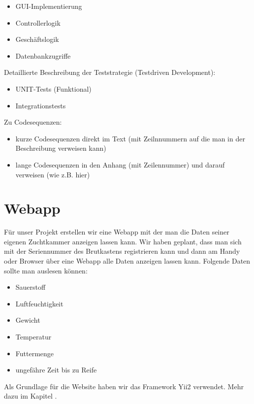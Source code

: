 \begin{itemize}
	\item GUI-Implementierung
	\item Controllerlogik
	\item Geschäftslogik
	\item Datenbankzugriffe
\end{itemize}

Detaillierte Beschreibung der Teststrategie (Testdriven Development):

\begin{itemize}
	\item UNIT-Tests (Funktional)
	\item Integrationstests
\end{itemize}

Zu Codesequenzen:
\begin{itemize}
	\item kurze Codesequenzen direkt im Text (mit Zeilnnummern auf die man in der Beschreibung verweisen kann)
	\item lange Codesequenzen in den Anhang (mit Zeilennummer) und darauf verweisen (wie z.B. hier)
	
	
\end{itemize}

\def \currentAuthor {Florian Tipotsch}

\section{Webapp}

Für unser Projekt erstellen wir eine Webapp mit der man die Daten seiner eigenen Zuchtkammer anzeigen lassen kann.
Wir haben geplant, dass man sich mit der Seriennummer des Brutkastens registrieren kann und dann am Handy oder Browser über eine Webapp alle Daten anzeigen lassen kann. Folgende Daten sollte man auslesen können:

\begin{itemize}
	\item Sauerstoff
	\item Luftfeuchtigkeit
	\item Gewicht
	\item Temperatur
	\item Futtermenge
	\item ungefähre Zeit bis zu Reife
\end{itemize}
Als Grundlage für die Website haben wir das Framework Yii2 verwendet. Mehr dazu im Kapitel .

